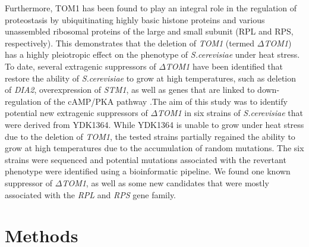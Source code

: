 \documentclass[10pt,a4paper]{article}
\begin{document}
\noindent Furthermore, TOM1 has been found to play an integral role in the regulation of proteostasis by ubiquitinating highly basic histone proteins \cite{singh_histone_2009} and various unassembled ribosomal proteins of the large and small subunit (RPL and RPS, respectively)\cite{sung_conserved_2016}. This demonstrates that the deletion of \textit{TOM1} (termed \textit{$\Delta$TOM1}) has a highly pleiotropic effect on the phenotype of \textit{S.cerevisiae} under heat stress. To date, several extragenic suppressors of \textit{$\Delta$TOM1} have been identified that restore the ability of  \textit{S.cerevisiae} to grow at high temperatures, such as deletion of \textit{DIA2}\cite{kim_hect_2012}, overexpression of \textit{STM1}\cite{utsugi_high_1995}, as well as genes that are linked to down-regulation of the cAMP/PKA pathway \cite{sasaki_extragenic_2000}.The aim of this study was to identify potential new extragenic suppressors of \textit{$\Delta$TOM1} in six strains of  \textit{S.cerevisiae} that were derived from YDK1364. While YDK1364 is unable to grow under heat stress due to the deletion of \textit{TOM1}, the tested strains partially regained the ability to grow at high temperatures due to the accumulation of random mutations. The six strains were sequenced and potential mutations associated with the revertant phenotype were identified using a bioinformatic pipeline. We found one known suppressor of \textit{$\Delta$TOM1}, as well as some new candidates that were mostly associated with the \textit{RPL} and \textit{RPS} gene family. \\



\section*{\large Methods}
\end{document}
